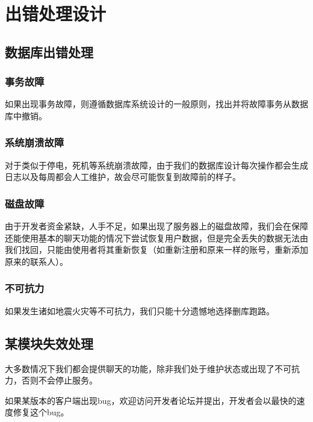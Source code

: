 \chapter{出错处理设计}
\section{数据库出错处理}
\subsection{事务故障}
如果出现事务故障，则遵循数据库系统设计的一般原则，找出并将故障事务从数据库中撤销。
\subsection{系统崩溃故障}
对于类似于停电，死机等系统崩溃故障，由于我们的数据库设计每次操作都会生成日志以及每周都会人工维护，故会尽可能恢复到故障前的样子。
\subsection{磁盘故障}
由于开发者资金紧缺，人手不足，如果出现了服务器上的磁盘故障，我们会在保障还能使用基本的聊天功能的情况下尝试恢复用户数据，但是完全丢失的数据无法由我们找回，只能由使用者将其重新恢复（如重新注册和原来一样的账号，重新添加原来的联系人）。
\subsection{不可抗力}
如果发生诸如地震火灾等不可抗力，我们只能十分遗憾地选择删库跑路。

\section{某模块失效处理}
大多数情况下我们都会提供聊天的功能，除非我们处于维护状态或出现了不可抗力，否则不会停止服务。

如果某版本的客户端出现bug，欢迎访问开发者论坛并提出，开发者会以最快的速度修复这个bug。